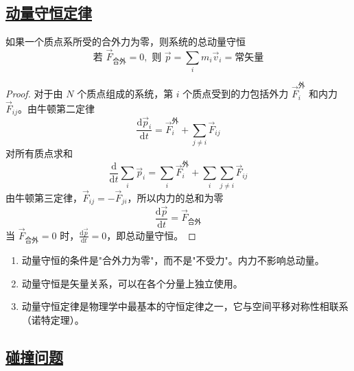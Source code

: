 \subsection{\protect\hyperlink{:}{动量守恒定律}}

\begin{theorem}[动量守恒定律]
    如果一个质点系所受的合外力为零，则系统的总动量守恒
    \begin{equation}
        \boxed{\text{若 } \vec{F}_{\text{合外}} = 0, \text{ 则 } \vec{p} = \sum_i m_i\vec{v}_i = \text{常矢量}}
    \end{equation}
\end{theorem}

\begin{proof}
    对于由 $N$ 个质点组成的系统，第 $i$ 个质点受到的力包括外力 $\vec{F}_i^{\text{外}}$ 和内力 $\vec{F}_{ij}$。由牛顿第二定律
    \begin{equation}
        \frac{\mathrm{d}\vec{p}_i}{\mathrm{d}t} = \vec{F}_i^{\text{外}} + \sum_{j \neq i} \vec{F}_{ij}
    \end{equation}
    对所有质点求和
    \begin{equation}
        \frac{\mathrm{d}}{\mathrm{d}t}\sum_i \vec{p}_i = \sum_i \vec{F}_i^{\text{外}} + \sum_i\sum_{j \neq i} \vec{F}_{ij}
    \end{equation}
    由牛顿第三定律，$\vec{F}_{ij} = -\vec{F}_{ji}$，所以内力的总和为零
    \begin{equation}
        \frac{\mathrm{d}\vec{p}}{\mathrm{d}t} = \vec{F}_{\text{合外}}
    \end{equation}
    当 $\vec{F}_{\text{合外}} = 0$ 时，$\frac{\mathrm{d}\vec{p}}{\mathrm{d}t} = 0$，即总动量守恒。
\end{proof}

\begin{remark}
    \begin{enumerate}
        \item 动量守恒的条件是"合外力为零"，而不是"不受力"。内力不影响总动量。
        \item 动量守恒是矢量关系，可以在各个分量上独立使用。
        \item 动量守恒定律是物理学中最基本的守恒定律之一，它与空间平移对称性相联系（诺特定理）。
    \end{enumerate}
\end{remark}

\subsection{\protect\hyperlink{:}{碰撞问题}}

